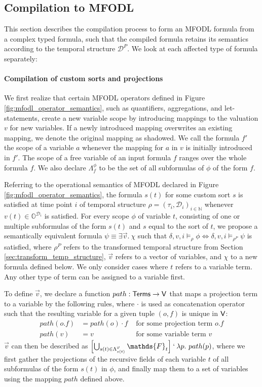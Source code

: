 \subsection{Compilation to MFODL}
\label{sec:compilation}
This section describes the compilation process to form an MFODL formula from a complex typed formula, such that the compiled formula retains its semantics according to the temporal structure $\mathcal{D}^P$. We look at each affected type of formula separately:

\paragraph{Compilation of custom sorts and projections}
We first realize that certain MFODL operators defined in Figure \ref{fig:mfodl_operator_semantics}, such as quantifiers, aggregations, and let-statements, create a new variable scope by introducing mappings to the valuation $v$ for new variables. If a newly introduced mapping overwrites an existing mapping, we denote the original mapping as shadowed. We call the formula $f'$ the scope of a variable $a$ whenever the mapping for $a$ in $v$ is initially introduced in $f'$. The scope of a free variable of an input formula $f$ ranges over the whole formula $f$. We also declare $\Lambda^{\phi}_f$ to be the set of all subformulas of $\phi$ of the form $f$.

Referring to the operational semantics of MFODL declared in Figure \ref{fig:mfodl_operator_semantics}, the formula $s(t)$ for some custom sort $s$ is satisfied at time point $i$ of temporal structure $\rho = (\tau_i, \mathcal{D}_i)_{i \in \mathds{N}}$ whenever $v(t) \in \mathds{O}^{\mathcal{D}_i}$ is satisfied. For every scope $\phi$ of variable $t$, consisting of one or multiple subformulas of the form $s(t)$ and $s$ equal to the sort of $t$, we propose a semantically equivalent formula $\psi \equiv \exists \vec{v} .\ \chi$ such that $\delta, v, i \models_{\rho} \phi \iff \delta, v, i \models_{\rho^P} \psi$ is satisfied, where $\rho^P$ refers to the transformed temporal structure from Section \ref{sec:transform_temp_structure}, $\vec{v}$ refers to a vector of variables, and $\chi$ to a new formula defined below. We only consider cases where $t$ refers to a variable term. Any other type of term can be assigned to a variable first.

To define $\vec{v}$, we declare a function $path: \mathsf{Terms} \to \mathsf{V}$ that maps a projection term to a variable by the following rules, where $\cdot$ is used as concatenation operator such that the resulting variable for a given tuple $(o, f)$ is unique in $\mathsf{V}$:
\begin{align*}
	path(o.f) & =  path(o) \cdot f & \text{ for some projection term } o.f \\
	path(v)   & =  v               & \text{ for some variable term } v
\end{align*}
$\vec{v}$ can then be described as $\left[\bigcup_{s(t) \in \Lambda^{\phi}_{s(t)}} \mathds{F}_t\right] \mfodlImage \lambda p.\ path(p)$, where we first gather the projections of the recursive fields of each variable $t$ of all subformulas of the form $s(t)$ in $\phi$, and finally map them to a set of variables using the mapping $path$ defined above.

